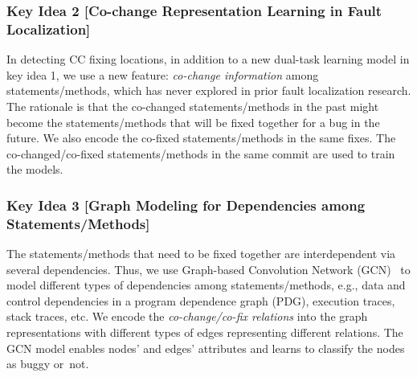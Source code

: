 \subsubsection{Key Idea 2 [Co-change Representation Learning in Fault
    Localization]} In detecting CC fixing locations, in addition to a
new dual-task learning model in key idea 1, we use a new feature: {\em
  co-change information} among statements/methods, which has never
explored in prior fault localization research. The rationale
is that the co-changed statements/methods in the past might become the
statements/methods that will be fixed together for a bug in the
future. We also encode the co-fixed statements/methods in the same
fixes. The co-changed/co-fixed statements/methods in the same commit
are used to train the models.





\subsubsection{Key Idea 3 [Graph Modeling for Dependencies among
    Statements/Methods]} The statements/methods that need to be fixed
together are interdependent via several dependencies. Thus, we use
Graph-based Convolution Network (GCN)~\cite{li2019gcn} to model
different types of dependencies among statements/methods, e.g., data
and control dependencies in a program dependence graph (PDG),
execution traces, stack traces, etc.
We encode the {\em co-change/co-fix relations}
into the graph representations with different types of edges
representing different relations. The GCN model enables nodes'
and edges' attributes and learns to classify the nodes as buggy
or~not.

